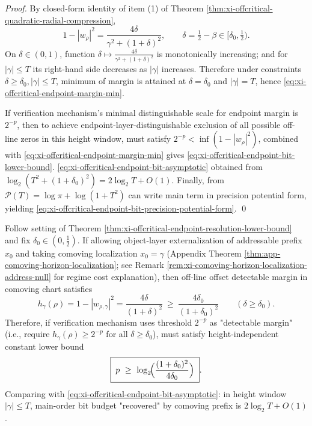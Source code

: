 \begin{proof}
By closed-form identity of item (1) of Theorem \ref{thm:xi-offcritical-quadratic-radial-compression},
\[
1-|w_\rho|^2=\frac{4\delta}{\gamma^2+(1+\delta)^2},
\qquad \delta=\tfrac12-\beta\in[\delta_0,\tfrac12).
\]
On \(\delta\in(0,1)\), function \(\delta\mapsto \frac{4\delta}{\gamma^2+(1+\delta)^2}\) is monotonically increasing; and for \(|\gamma|\le T\) its right-hand side decreases as \(|\gamma|\) increases.
Therefore under constraints \(\delta\ge\delta_0,|\gamma|\le T\), minimum of margin is attained at \(\delta=\delta_0\) and \(|\gamma|=T\), hence \eqref{eq:xi-offcritical-endpoint-margin-min}.
\par
If verification mechanism's minimal distinguishable scale for endpoint margin is \(2^{-p}\), then to achieve endpoint-layer-distinguishable exclusion of all possible off-line zeros in this height window, must satisfy \(2^{-p}<\inf(1-|w_\rho|^2)\), combined with \eqref{eq:xi-offcritical-endpoint-margin-min} gives \eqref{eq:xi-offcritical-endpoint-bit-lower-bound}.
\eqref{eq:xi-offcritical-endpoint-bit-asymptotic} obtained from \(\log_2(T^2+(1+\delta_0)^2)=2\log_2 T+O(1)\).
Finally, from \(\mathcal{P}(T)=\log\pi+\log(1+T^2)\) can write main term in precision potential form, yielding \eqref{eq:xi-offcritical-endpoint-bit-precision-potential-form}. \qed
\end{proof}

\begin{corollary}[Bit budget gain law of comoving prefix: second-order compression \texorpdfstring{$\Rightarrow$}{=>} constant budget]\label{cor:xi-comoving-prefix-bit-budget-gain}
Follow setting of Theorem \ref{thm:xi-offcritical-endpoint-resolution-lower-bound} and fix \(\delta_0\in(0,\tfrac12)\).
If allowing object-layer externalization of addressable prefix \(x_0\) and taking comoving localization \(x_0=\gamma\) (Appendix Theorem \ref{thm:app-comoving-horizon-localization}; see Remark \ref{rem:xi-comoving-horizon-localization-address-null} for regime cost explanation), then off-line offset detectable margin in comoving chart satisfies
\[
h_{\gamma}(\rho)=1-|w_{\rho,\gamma}|^2=\frac{4\delta}{(1+\delta)^2}\ \ge\ \frac{4\delta_0}{(1+\delta_0)^2}\qquad(\delta\ge\delta_0).
\]
Therefore, if verification mechanism uses threshold \(2^{-p}\) as "detectable margin" (i.e., require \(h_{\gamma}(\rho)\ge 2^{-p}\) for all \(\delta\ge\delta_0\)), must satisfy height-independent constant lower bound
\begin{equation}\label{eq:xi-comoving-bit-threshold}
\boxed{\;
p\ \ge\ \log_2\!\Bigl(\frac{(1+\delta_0)^2}{4\delta_0}\Bigr)\; }.
\end{equation}
Comparing with \eqref{eq:xi-offcritical-endpoint-bit-asymptotic}: in height window \(|\gamma|\le T\), main-order bit budget "recovered" by comoving prefix is \(2\log_2T+O(1)\).
\end{corollary}

